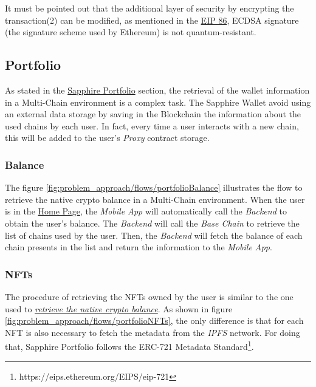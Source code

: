 It must be pointed out that the additional layer of security by encrypting the transaction(2) can be modified, as mentioned in the \hyperref[subsubsec:eip-86]{EIP 86}, ECDSA signature (the signature scheme used by Ethereum) is not quantum-resistant.



\subsection{Portfolio}

As stated in the \hyperref[subsec:sapphire_portfolio]{Sapphire Portfolio} section, the retrieval of the wallet information in a Multi-Chain environment is a complex task. The Sapphire Wallet avoid using an external data storage by saving in the Blockchain the information about the used chains by each user. In fact, every time a user interacts with a new chain, this will be added to the user's \textit{Proxy} contract storage.

\subsubsection{Balance}
\label{subsubsec:balance}


The figure \ref{fig:problem_approach/flows/portfolioBalance} illustrates the flow to retrieve the native crypto balance in a Multi-Chain environment. When the user is in the \hyperref[subsec:wallet_home_page]{Home Page}, the \textit{Mobile App} will automatically call the \textit{Backend} to obtain the user's balance. The \textit{Backend} will call the \textit{Base Chain} to retrieve the list of chains used by the user. Then, the \textit{Backend} will fetch the balance of each chain presents in the list and return the information to the \textit{Mobile App}.


\subsubsection{NFTs}

The procedure of retrieving the NFTs owned by the user is similar to the one used to  \hyperref[subsubsec:balance]{\textit{retrieve the native crypto balance}}. As shown in figure \ref{fig:problem_approach/flows/portfolioNFTs}, the only difference is that for each NFT is also necessary to fetch the metadata from the \textit{IPFS} network. For doing that, Sapphire Portfolio follows the ERC-721 Metadata Standard\footnote{https://eips.ethereum.org/EIPS/eip-721}. 

